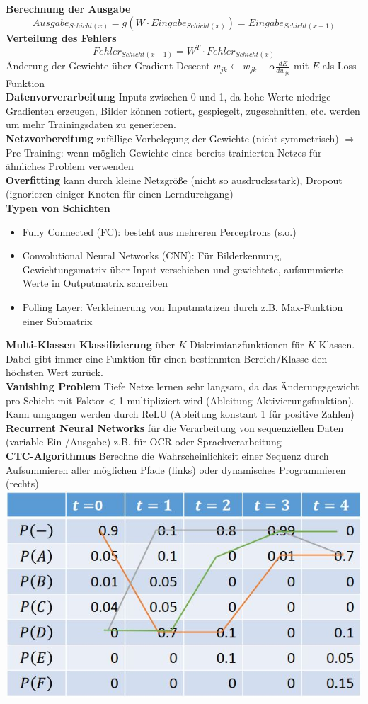 \documentclass[12pt]{article}
\begin{document}
	\textbf{Berechnung der Ausgabe}
	$$Ausgabe_{Schicht(x)} = g(W \cdot Eingabe_{Schicht(x)}) = Eingabe_{Schicht(x+1)}$$
	\textbf{Verteilung des Fehlers}
	$$Fehler_{Schicht(x-1)} = W^T \cdot Fehler_{Schicht(x)}$$
	Änderung der Gewichte über Gradient Descent $w_{jk} \leftarrow w_{jk} - \alpha \frac{dE}{dw_{jk}}$ mit $E$ als Loss-Funktion\\
	\textbf{Datenvorverarbeitung} Inputs zwischen 0 und 1, da hohe Werte niedrige Gradienten erzeugen, Bilder können rotiert, gespiegelt, zugeschnitten, etc. werden um mehr Trainingsdaten zu generieren.\\
	\textbf{Netzvorbereitung} zufällige Vorbelegung der Gewichte (nicht symmetrisch) $\Rightarrow$ Pre-Training: wenn möglich Gewichte eines bereits trainierten Netzes für ähnliches Problem verwenden\\
	\textbf{Overfitting} kann durch kleine Netzgröße (nicht so ausdrucksstark), Dropout (ignorieren einiger Knoten für einen Lerndurchgang)\\
	\textbf{Typen von Schichten}
	\begin{itemize}
		\item Fully Connected (FC): besteht aus mehreren Perceptrons (s.o.)
		\item Convolutional Neural Networks (CNN): Für Bilderkennung, Gewichtungsmatrix über Input verschieben und gewichtete, aufsummierte Werte in Outputmatrix schreiben
		\item Polling Layer: Verkleinerung von Inputmatrizen durch z.B. Max-Funktion einer Submatrix
	\end{itemize}
	\textbf{Multi-Klassen Klassifizierung} über $K$ Diskrimianzfunktionen für $K$ Klassen. Dabei gibt immer eine Funktion für einen bestimmten Bereich/Klasse den höchsten Wert zurück.\\
	\textbf{Vanishing Problem} Tiefe Netze lernen sehr langsam, da das Änderungsgewicht pro Schicht mit Faktor < 1 multipliziert wird (Ableitung Aktivierungsfunktion). Kann umgangen werden durch ReLU (Ableitung konstant 1 für positive Zahlen)\\
	\textbf{Recurrent Neural Networks} für die Verarbeitung von sequenziellen Daten (variable Ein-/Ausgabe) z.B. für OCR oder Sprachverarbeitung\\
	\textbf{CTC-Algorithmus} Berechne die Wahrscheinlichkeit einer Sequenz durch Aufsummieren aller möglichen Pfade (links) oder dynamisches Programmieren (rechts)\\
	\includegraphics[width=0.5\linewidth]{figures/ctc-pfade.JPG}
\end{document}
